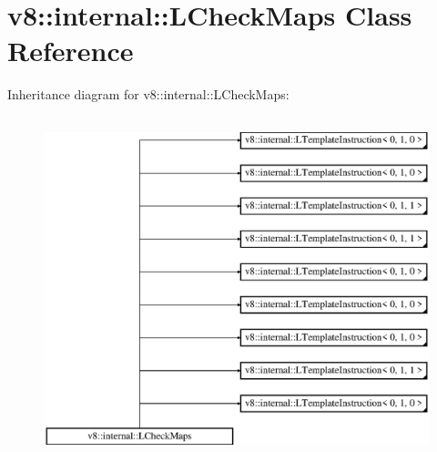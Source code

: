 \hypertarget{classv8_1_1internal_1_1_l_check_maps}{}\section{v8\+:\+:internal\+:\+:L\+Check\+Maps Class Reference}
\label{classv8_1_1internal_1_1_l_check_maps}
Inheritance diagram for v8\+:\+:internal\+:\+:L\+Check\+Maps\+:\begin{figure}[H]
\begin{center}
\leavevmode
\includegraphics[height=10.000000cm]{classv8_1_1internal_1_1_l_check_maps}
\end{center}
\end{figure}
